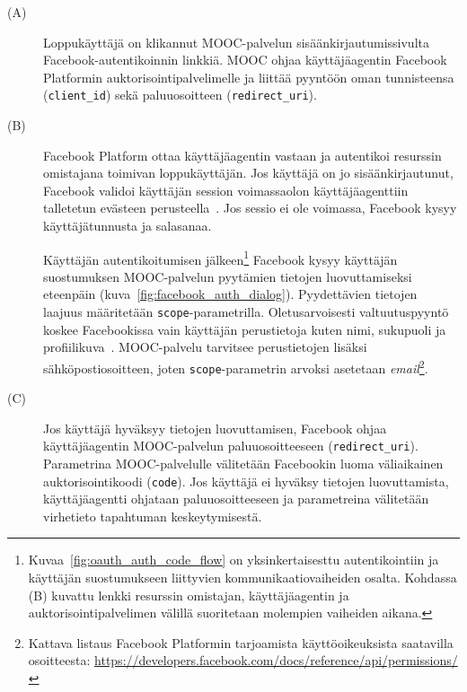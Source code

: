 \documentclass[finnish,gradu]{tktltiki}
\begin{document}
  \begin{description}
  \item[(A)]
   Loppukäyttäjä on klikannut MOOC-palvelun sisäänkirjautumissivulta Face\-book-au\-tentikoinnin linkkiä.
   MOOC ohjaa käyttäjäagentin Facebook Platformin auktorisointipalvelimelle ja liittää pyyntöön oman tunnisteensa (\verb!client_id!) sekä paluuosoitteen (\verb!redirect_uri!).

  \item[(B)]
  Facebook Platform ottaa käyttäjäagentin vastaan ja autentikoi resurssin omistajana toimivan loppukäyttäjän. Jos käyttäjä on jo sisäänkirjautunut, Facebook validoi käyttäjän session voimassaolon  käyttäjäagenttiin talletetun evästeen perusteella~\cite{facebook_oauth2_doc}. Jos sessio ei ole voimassa, Facebook kysyy käyttäjätunnusta ja salasanaa.

  Käyttäjän autentikoitumisen jälkeen\footnote{
    Kuvaa~\ref{fig:oauth_auth_code_flow} on yksinkertaisesttu autentikointiin ja käyttäjän suostumukseen liittyvien kommunikaatiovaiheiden osalta. Kohdassa (B) kuvattu lenkki resurssin omistajan, käyttäjäagentin ja auktorisointipalvelimen välillä suoritetaan molempien vaiheiden aikana.
  }
  Facebook kysyy käyttäjän suostumuksen MOOC-palvelun pyytämien tietojen luovuttamiseksi eteenpäin (kuva~\ref{fig:facebook_auth_dialog}). Pyydettävien tietojen laajuus määritetään \verb!scope!-parametrilla. Oletusarvoisesti valtuutuspyyntö koskee Facebookissa vain käyttäjän perustietoja kuten nimi, sukupuoli ja profiilikuva~\cite{facebook_oauth2_doc}. MOOC-palvelu tarvitsee perustietojen lisäksi sähköpostiosoitteen, joten \verb!scope!-parametrin arvoksi asetetaan \emph{email}\footnote{
    Kattava listaus Facebook Platformin tarjoamista käyttöoikeuksista saatavilla osoitteesta:
    \url{https://developers.facebook.com/docs/reference/api/permissions/}
  }.


  \item[(C)]

  Jos käyttäjä hyväksyy tietojen luovuttamisen, Facebook ohjaa käyttäjäagentin MOOC-palvelun paluuosoitteeseen (\verb!redirect_uri!). Parametrina MOOC-palvelulle välitetään Facebookin luoma väliaikainen auktorisointikoodi (\verb!code!).
  Jos käyttäjä ei hyväksy tietojen luovuttamista, käyttäjäagentti ohjataan paluuosoitteeseen ja parametreina välitetään virhetieto tapahtuman keskeytymisestä.


\end{description}
\end{document}

